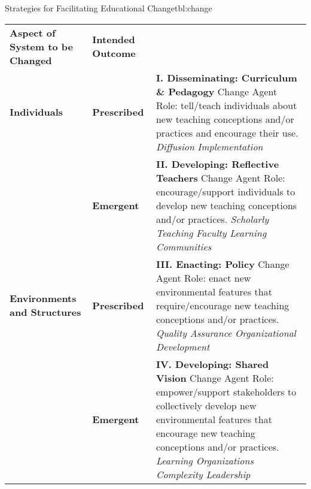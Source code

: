 \begin{tbllbl}{Strategies for Facilitating Educational Change}{tbl:change}
\begin{tabular}{|p{}|p{}|p{}|}

\textbf{Aspect of System to be Changed}
&
\textbf{Intended Outcome}
&
\\

\textbf{Individuals}
&
\textbf{Prescribed}
&
  \textbf{I. Disseminating: Curriculum \& Pedagogy}
  \newline
  Change Agent Role: tell/teach individuals about new teaching conceptions and/or practices and encourage their use.
  \newline
  \emph{Diffusion}
  \newline
  \emph{Implementation}
\\

&
\textbf{Emergent}
&
  \textbf{II. Developing: Reflective Teachers}
  \newline
  Change Agent Role: encourage/support individuals to develop new teaching conceptions and/or practices.
  \newline
  \emph{Scholarly Teaching}
  \newline
  \emph{Faculty Learning Communities}
\\

\textbf{Environments and Structures}
&
\textbf{Prescribed}
&
  \textbf{III. Enacting: Policy}
  \newline
  Change Agent Role: enact new environmental features that require/encourage new teaching conceptions and/or practices.
  \newline
  \emph{Quality Assurance}
  \newline
  \emph{Organizational Development}
\\

&
\textbf{Emergent}
&
  \textbf{IV. Developing: Shared Vision}
  \newline
  Change Agent Role: empower/support stakeholders to collectively develop new environmental features that encourage new teaching conceptions and/or practices.
  \newline
  \emph{Learning Organizations}
  \newline
  \emph{Complexity Leadership}
\\
\end{tabular}
\end{tbllbl}


